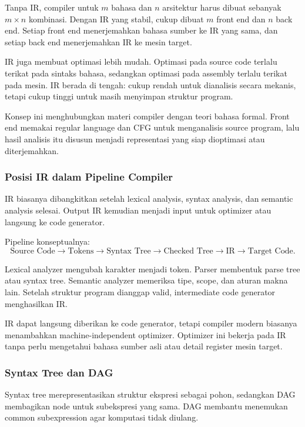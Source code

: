 Tanpa IR, compiler untuk $m$ bahasa dan $n$ arsitektur harus dibuat sebanyak $m\times n$ kombinasi. Dengan IR yang stabil, cukup dibuat $m$ front end dan $n$ back end. Setiap front end menerjemahkan bahasa sumber ke IR yang sama, dan setiap back end menerjemahkan IR ke mesin target.

IR juga membuat optimasi lebih mudah. Optimasi pada source code terlalu terikat pada sintaks bahasa, sedangkan optimasi pada assembly terlalu terikat pada mesin. IR berada di tengah: cukup rendah untuk dianalisis secara mekanis, tetapi cukup tinggi untuk masih menyimpan struktur program.

Konsep ini menghubungkan materi compiler dengan teori bahasa formal. Front end memakai regular language dan CFG untuk menganalisis source program, lalu hasil analisis itu disusun menjadi representasi yang siap dioptimasi atau diterjemahkan.

\subsubsection{Posisi IR dalam Pipeline Compiler}

\begin{jawab}
IR biasanya dibangkitkan setelah lexical analysis, syntax analysis, dan semantic analysis selesai. Output IR kemudian menjadi input untuk optimizer atau langsung ke code generator.
\end{jawab}

Pipeline konseptualnya:
\[
    \text{Source Code}
    \rightarrow \text{Tokens}
    \rightarrow \text{Syntax Tree}
    \rightarrow \text{Checked Tree}
    \rightarrow \text{IR}
    \rightarrow \text{Target Code}.
\]

Lexical analyzer mengubah karakter menjadi token. Parser membentuk parse tree atau syntax tree. Semantic analyzer memeriksa tipe, scope, dan aturan makna lain. Setelah struktur program dianggap valid, intermediate code generator menghasilkan IR.

IR dapat langsung diberikan ke code generator, tetapi compiler modern biasanya menambahkan machine-independent optimizer. Optimizer ini bekerja pada IR tanpa perlu mengetahui bahasa sumber asli atau detail register mesin target.

\subsubsection{Syntax Tree dan DAG}

\begin{jawab}
Syntax tree merepresentasikan struktur ekspresi sebagai pohon, sedangkan DAG membagikan node untuk subekspresi yang sama. DAG membantu menemukan common subexpression agar komputasi tidak diulang.
\end{jawab}

